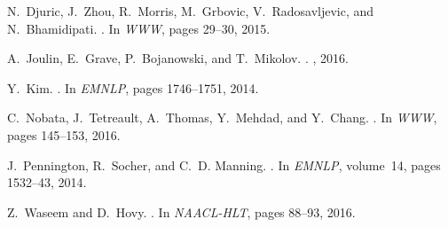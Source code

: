 \documentclass[letterpaper]{sig-alternate-2013}
\begin{document}
\begin{thebibliography}{1}
	
	N.~Djuric, J.~Zhou, R.~Morris, M.~Grbovic, V.~Radosavljevic, and
	N.~Bhamidipati.
	.
	\newblock In {\em WWW}, pages 29--30, 2015.
	
	A.~Joulin, E.~Grave, P.~Bojanowski, and T.~Mikolov.
	.
	, 2016.
	
	Y.~Kim.
	.
	\newblock In {\em EMNLP}, pages 1746--1751, 2014.
	
	C.~Nobata, J.~Tetreault, A.~Thomas, Y.~Mehdad, and Y.~Chang.
	.
	\newblock In {\em WWW}, pages 145--153, 2016.
	
	J.~Pennington, R.~Socher, and C.~D. Manning.
	.
	\newblock In {\em EMNLP}, volume~14, pages 1532--43, 2014.
	
	Z.~Waseem and D.~Hovy.
	.
	\newblock In {\em NAACL-HLT}, pages 88--93, 2016.
	
\end{thebibliography}
\end{document}
